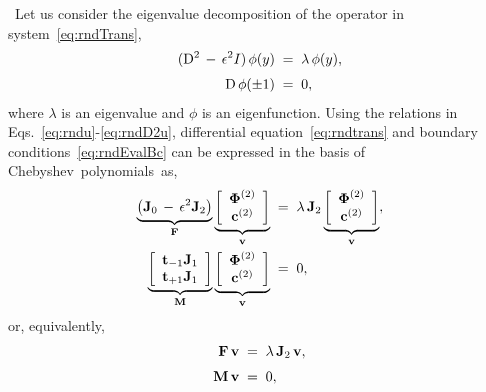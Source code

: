 \documentclass[%
secnumarabic,%
 amssymb, amsmath,%
 aps,prf,superscriptaddress,longbibliography
frontmatterverbose,
]{revtex4-2}
\begin{document}
	\vspace*{1ex}	
~Let us consider the eigenvalue decomposition of the operator in system~\eqref{eq:rndTrans},
	\begin{subequations}\label{eq:rndEig}
  \begin{align}
    (\mathrm D^2  \,-\, \epsilon^2 I)\, \phi (y) \;&=\; \lambda\,\phi (y),
    \label{eq:rndtrans}
    \\[0.1cm]
    \mathrm D\,\phi (\pm 1)\;&=\;0,\label{eq:rndEvalBc}
  \end{align}   
\end{subequations}
where $\lambda$ is an eigenvalue and $\phi$ is an eigenfunction. Using the relations in Eqs.~\eqref{eq:rndu}-\eqref{eq:rndD2u}, differential equation~\eqref{eq:rndtrans} and boundary conditions~\eqref{eq:rndEvalBc} can be expressed in the basis of \mbox{Chebyshev polynomials~as,}
\begin{subequations}
\begin{align}
   \underbrace{\left( \mathbf J_0 \, - \, \epsilon^2 \mathbf J_2 \right)}_{\mathbf{F}}
  \underbrace{\left[\begin{array}{c} \boldsymbol \Phi^{(2)} \\ \mathbf c^{(2)}  \end{array}\right] }_{\mathbf{v} }
  \;&=\;  
  \lambda \, \mathbf J_2
\underbrace{\left[\begin{array}{c} \boldsymbol \Phi^{(2)} \\ \mathbf c^{(2)}  \end{array}\right] }_{\mathbf{v}}, 
	\\
     \underbrace{ \left[\begin{array}{c}
      \mathbf{t}_{-1}\mathbf J_1\\
      \mathbf{t}_{+1}\mathbf J_1
     \end{array}\right] }_{\mathbf{M}} 
    \underbrace{\left[\begin{array}{c} \boldsymbol \Phi^{(2)} \\ \mathbf c^{(2)}  \end{array}\right] }_{\mathbf{v} }
    \;&=\;  
    0,
    \end{align}
  \end{subequations}
or, equivalently,
	\begin{subequations}
	\label{eq1:rndDiff}
\begin{align}
	\label{eq:rndDiffeig}
  \mathbf{F}\, \mathbf{v} \;&=\; \lambda \, \mathbf{J}_2 \, \mathbf{v},
  \\[0.1cm]
  \mathbf{M} \, \mathbf{v} \;&=\; 0,
  \label{eq:rndDiffeigBc}
\end{align}
\end{subequations}
\end{document}
